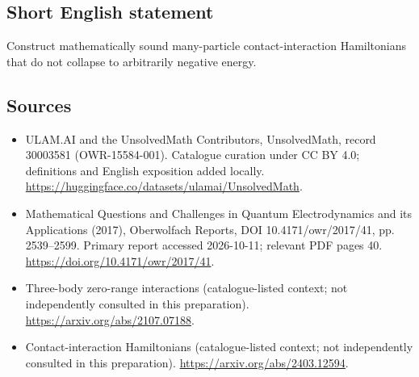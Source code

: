 \documentclass[11pt]{article}
\begin{document}
\subsection{Short English statement}
Construct mathematically sound many-particle contact-interaction Hamiltonians that do not collapse to arbitrarily negative energy.
\subsection{Sources}
\begin{itemize}
\item[\hypertarget{source:30003581:1}{S1}] ULAM.AI and the UnsolvedMath Contributors, UnsolvedMath, record 30003581 (OWR-15584-001). Catalogue curation under CC BY 4.0; definitions and English exposition added locally.
\url{https://huggingface.co/datasets/ulamai/UnsolvedMath}.
\item[\hypertarget{source:30003581:2}{S2}] Mathematical Questions and Challenges in Quantum Electrodynamics and its Applications (2017), Oberwolfach Reports, DOI 10.4171/owr/2017/41, pp. 2539--2599. Primary report accessed 2026-10-11; relevant PDF pages 40.
\url{https://doi.org/10.4171/owr/2017/41}.
\item[\hypertarget{source:30003581:3}{S3}] Three-body zero-range interactions (catalogue-listed context; not independently consulted in this preparation).
\url{https://arxiv.org/abs/2107.07188}.
\item[\hypertarget{source:30003581:4}{S4}] Contact-interaction Hamiltonians (catalogue-listed context; not independently consulted in this preparation).
\url{https://arxiv.org/abs/2403.12594}.
\end{itemize}
\label{end:30003581}
\end{document}
